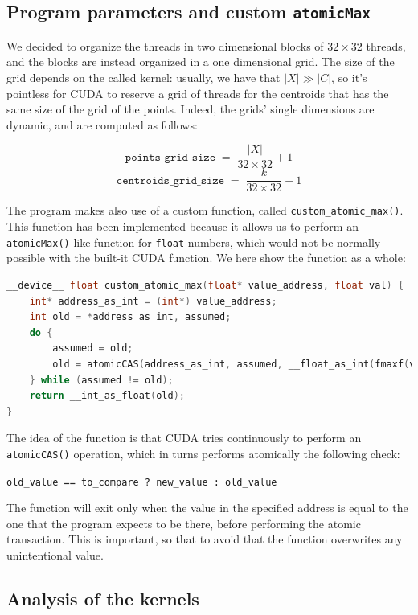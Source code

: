 \documentclass[11pt, journal]{IEEEtran}
\newcommand{\nwl}{

\vspace{11pt}

}
\begin{document}
\subsection{Program parameters and custom \texttt{atomicMax}}

We decided to organize the threads in two dimensional blocks of $32 \times 32$ threads, and the blocks are instead organized in a one dimensional grid. The size of the grid depends on the called kernel: usually, we have that $|X| \gg |C|$, so it's pointless for CUDA to reserve a grid of threads for the centroids that has the same size of the grid of the points. Indeed, the grids' single dimensions are dynamic, and are computed as follows:

\[ \texttt{points\_grid\_size} \; = \; \frac{\left| X \right|}{32 \times 32} + 1 \]
\[ \texttt{centroids\_grid\_size} \; = \; \frac{k}{32 \times 32} + 1 \]

The program makes also use of a custom function, called \verb|custom_atomic_max()|. This function has been implemented because it allows us to perform an \verb|atomicMax()|-like function for \verb|float| numbers, which would not be normally possible with the built-it CUDA function. We here show the function as a whole:
\nwl
\begin{lstlisting}[language = C]
__device__ float custom_atomic_max(float* value_address, float val) {
    int* address_as_int = (int*) value_address;
    int old = *address_as_int, assumed;
    do {
        assumed = old;
        old = atomicCAS(address_as_int, assumed, __float_as_int(fmaxf(val, __int_as_float(assumed))));
    } while (assumed != old);
    return __int_as_float(old);
}\end{lstlisting}
\nwl
The idea of the function is that CUDA tries continuously to perform an \verb|atomicCAS()| operation, which in turns performs atomically the following check:
\begin{center}
    \scriptsize
    \verb|old_value == to_compare ? new_value : old_value|
\end{center}

The function will exit only when the value in the specified address is equal to the one that the program expects to be there, before performing the atomic transaction. This is important, so that to avoid that the function overwrites any unintentional value.

\subsection{Analysis of the kernels}
\end{document}
